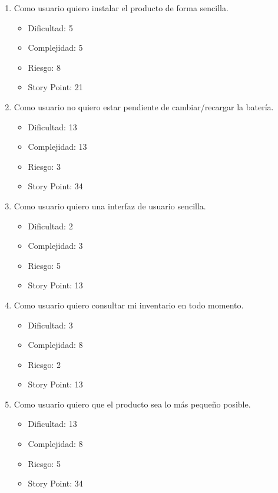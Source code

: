 \documentclass[
11pt, %
codirector, %
]{charter}
\begin{document}
\begin{enumerate}
    \item Como usuario quiero instalar el producto de forma sencilla.
        \begin{itemize}
            \item Dificultad: 5
            \item Complejidad: 5
            \item Riesgo: 8
            \item Story Point: 21
        \end{itemize}

     \item Como usuario no quiero estar pendiente de cambiar/recargar la batería.
        \begin{itemize}
            \item Dificultad: 13
            \item Complejidad: 13
            \item Riesgo: 3
            \item Story Point: 34
        \end{itemize}

    \item Como usuario quiero una interfaz de usuario sencilla.
        \begin{itemize}
            \item Dificultad: 2
            \item Complejidad: 3
            \item Riesgo: 5
            \item Story Point: 13
        \end{itemize}

    \item Como usuario quiero consultar mi inventario en todo momento.
        \begin{itemize}
            \item Dificultad: 3
            \item Complejidad: 8
            \item Riesgo: 2
            \item Story Point: 13
        \end{itemize}
    \item Como usuario quiero que el producto sea lo más pequeño posible.
        \begin{itemize}
            \item Dificultad: 13
            \item Complejidad: 8
            \item Riesgo: 5
            \item Story Point: 34
        \end{itemize}
\end{enumerate}
\end{document}

